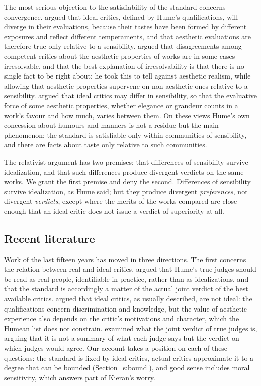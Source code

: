 \documentclass{situationist-preprint}
\begin{document}
The most serious objection to the satisfiability of the standard concerns convergence. \citet{Goldman1995} argued that ideal critics, defined by Hume's qualifications, will diverge in their evaluations, because their tastes have been formed by different exposures and reflect different temperaments, and that aesthetic evaluations are therefore true only relative to a sensibility. \citet{Bender1996} argued that disagreements among competent critics about the aesthetic properties of works are in some cases irresolvable, and that the best explanation of irresolvability is that there is no single fact to be right about; he took this to tell against aesthetic realism, while allowing that aesthetic properties supervene on non-aesthetic ones relative to a sensibility. \citet{Levinson2001} argued that ideal critics may differ in sensibility, so that the evaluative force of some aesthetic properties, whether elegance or grandeur counts in a work's favour and how much, varies between them. On these views Hume's own concession about humours and manners is not a residue but the main phenomenon: the standard is satisfiable only within communities of sensibility, and there are facts about taste only relative to such communities.

The relativist argument has two premises: that differences of sensibility survive idealization, and that such differences produce divergent verdicts on the same works. We grant the first premise and deny the second. Differences of sensibility survive idealization, as Hume said; but they produce divergent \emph{preferences}, not divergent \emph{verdicts}, except where the merits of the works compared are close enough that an ideal critic does not issue a verdict of superiority at all.

\subsection{Recent literature}

Work of the last fifteen years has moved in three directions. The first concerns the relation between real and ideal critics. \citet{Ross2008} argued that Hume's true judges should be read as real people, identifiable in practice, rather than as idealizations, and that the standard is accordingly a matter of the actual joint verdict of the best available critics. \citet{Kieran2008} argued that ideal critics, as usually described, are not ideal: the qualifications concern discrimination and knowledge, but the value of aesthetic experience also depends on the critic's motivations and character, which the Humean list does not constrain. \citet{Shelley2013} examined what the joint verdict of true judges is, arguing that it is not a summary of what each judge says but the verdict on which judges would agree. Our account takes a position on each of these questions: the standard is fixed by ideal critics, actual critics approximate it to a degree that can be bounded (Section~\ref{s:bound}), and good sense includes moral sensitivity, which answers part of Kieran's worry.
\end{document}
